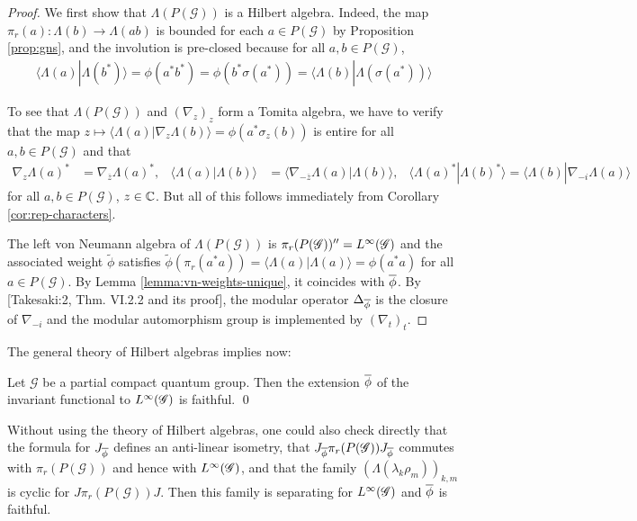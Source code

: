 \begin{proof}
  We first show that $\Lambda(P(\mathscr{G}))$ is a Hilbert algebra. Indeed, the
  map $\pi_{r}(a)\colon \Lambda(b) \to \Lambda(ab)$ is bounded for
  each $a \in P(\mathscr{G})$ by Proposition \ref{prop:gns}, and the involution is
  pre-closed because  for all $a,b \in P(\mathscr{G})$,
  \begin{align*}
    \langle \Lambda(a)|\Lambda(b^{*})\rangle = \phi(a^{*}b^{*}) =
    \phi(b^{*}\sigma(a^{*})) = \langle
    \Lambda(b)|\Lambda(\sigma(a^{*}))\rangle
  \end{align*}

To see that $\Lambda(P(\mathscr{G}))$ and $(\nabla_{z})_{z}$ form a Tomita
  algebra, we have to verify that the map
  $z\mapsto
  \langle \Lambda(a)|\nabla_{z}\Lambda(b)\rangle =
  \phi(a^{*}\sigma_{z}(b))$ is entire for all $a,b\in P(\mathscr{G})$ and that
  \begin{align*}
    \nabla_{z}\Lambda(a)^{*} &= \nabla_{\overline{z}}\Lambda(a)^{*}, &
    \langle \Lambda(a)|\Lambda(b)\rangle &= \langle
    \nabla_{-\overline{z}}\Lambda(a) |\Lambda(b)\rangle, & \langle
    \Lambda(a)^{*}|\Lambda(b)^{*}\rangle = \langle \Lambda(b)|\nabla_{-i}\Lambda(a)\rangle
  \end{align*}
  for all $a,b\in P(\mathscr{G})$, $z\in \mathbb{C}$. But all of this follows immediately
  from Corollary \ref{cor:rep-characters}.


  The left von Neumann algebra of $\Lambda(P(\mathscr{G}))$ is
  $\pi_{r}(P(\mathscr{G}))''=L^{\infty}(\mathscr{G})$ and the associated weight $\tilde\phi$
  satisfies $\tilde
  \phi(\pi_{r}(a^{*}a))=\langle\Lambda(a)|\Lambda(a)\rangle =
  \phi(a^{*}a)$ for all $a\in P(\mathscr{G})$. By Lemma
  \ref{lemma:vn-weights-unique}, it coincides with $\overline{\phi}$.  By
  \cite{} [Takesaki:2, Thm. VI.2.2 and its proof], the modular
  operator $\Delta_{\overline{\phi}}$ is the closure of $\nabla_{-i}$ and the
  modular automorphism group is implemented by $(\nabla_{t})_{t}$. 
\end{proof}
 The general theory of Hilbert algebras \cite{} implies now:
\begin{Prop} \label{prop:hilbert-algebra} Let $\mathscr{G}$ be a
  partial compact quantum group. Then the extension $\overline{\phi}$ of the
  invariant functional to $L^{\infty}(\mathscr{G})$ is faithful. \qed
\end{Prop}
\begin{Rem}
  Without using the theory of Hilbert algebras, one could also check
  directly that the formula for $J_{\overline{\phi}}$ defines an anti-linear
  isometry, that $J_{\overline{\phi}}\pi_{r}(P(\mathscr{G}))J_{\overline{\phi}}$ commutes with $\pi_{r}(P(\mathscr{G}))$ and hence
  with $L^{\infty}(\mathscr{G})$, and that the family
  $(\Lambda(\lambda_{k}\rho_{m}))_{k,m}$ is cyclic for
  $J\pi_{r}(P(\mathscr{G}))J$. Then this family is separating for $L^{\infty}(\mathscr{G})$ and
  $\overline{\phi}$ is faithful.
\end{Rem}

